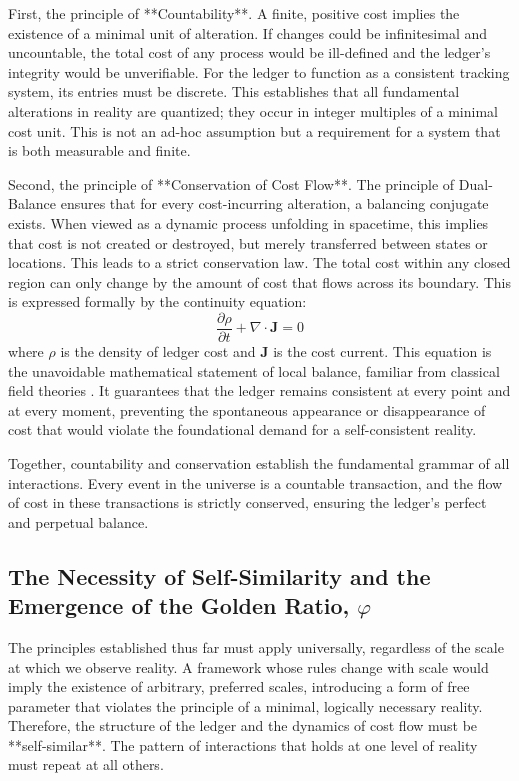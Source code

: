 First, the principle of **Countability**. A finite, positive cost implies the existence of a minimal unit of alteration. If changes could be infinitesimal and uncountable, the total cost of any process would be ill-defined and the ledger's integrity would be unverifiable. For the ledger to function as a consistent tracking system, its entries must be discrete. This establishes that all fundamental alterations in reality are quantized; they occur in integer multiples of a minimal cost unit. This is not an ad-hoc assumption but a requirement for a system that is both measurable and finite.

Second, the principle of **Conservation of Cost Flow**. The principle of Dual-Balance ensures that for every cost-incurring alteration, a balancing conjugate exists. When viewed as a dynamic process unfolding in spacetime, this implies that cost is not created or destroyed, but merely transferred between states or locations. This leads to a strict conservation law. The total cost within any closed region can only change by the amount of cost that flows across its boundary. This is expressed formally by the continuity equation:
\begin{equation}
\frac{\partial\rho}{\partial t} + \nabla \cdot \mathbf{J} = 0
\end{equation}
where \(\rho\) is the density of ledger cost and \(\mathbf{J}\) is the cost current. This equation is the unavoidable mathematical statement of local balance, familiar from classical field theories \cite{Jackson1999}. It guarantees that the ledger remains consistent at every point and at every moment, preventing the spontaneous appearance or disappearance of cost that would violate the foundational demand for a self-consistent reality.

Together, countability and conservation establish the fundamental grammar of all interactions. Every event in the universe is a countable transaction, and the flow of cost in these transactions is strictly conserved, ensuring the ledger's perfect and perpetual balance.

\subsection{The Necessity of Self-Similarity and the Emergence of the Golden Ratio, $\varphi$}
The principles established thus far must apply universally, regardless of the scale at which we observe reality. A framework whose rules change with scale would imply the existence of arbitrary, preferred scales, introducing a form of free parameter that violates the principle of a minimal, logically necessary reality. Therefore, the structure of the ledger and the dynamics of cost flow must be **self-similar**. The pattern of interactions that holds at one level of reality must repeat at all others.

